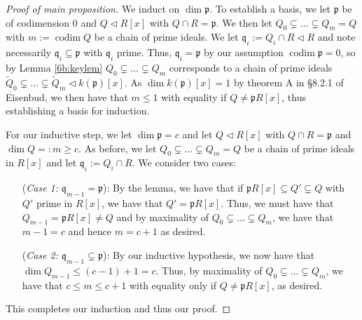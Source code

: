 \documentclass[Letter,12pt]{article}
\newcommand{\pfr}{\mathfrak{p}}
\newcommand{\qfr}{\mathfrak{q}}
\newcommand{\<}{\left\langle}
\renewcommand{\>}{\right\rangle}
\DeclareMathOperator{\codim}{codim}
\theoremstyle{definition}
\begin{document}
\begin{proof}[Proof of main proposition]
We induct on $\dim \pfr$. To establish a basis, we let $\pfr$ be of codimension $0$ and $Q\triangleleft R[x]$ with $Q\cap R=\pfr$. We then let $Q_0\subsetneq \dots \subsetneq Q_m=Q$ with $m:=\codim Q$ be a chain of prime ideals. We let $\qfr_i:=Q_i\cap R\triangleleft R$ and note necessarily $\qfr_i\subseteq \pfr$ with $\qfr_i$ prime. Thus, $\qfr_i=\pfr$ by our assumption $\codim \pfr=0$, so by Lemma \ref{6b:keylem} $Q_0\subsetneq \dots \subsetneq Q_m$ corresponds to a chain of prime ideals $\tilde{Q}_0\subsetneq \dots \subsetneq \tilde{Q}_m\triangleleft k(\pfr)[x]$. As $\dim k(\pfr)[x]=1$ by theorem A in \S8.2.1 of Eisenbud, we then have that $m\leq 1$ with equality if $Q\neq \pfr R[x]$, thus establishing a basis for induction.

For our inductive step, we let $\dim \pfr =c$ and let $Q\triangleleft R[x]$ with $Q\cap R=\pfr$ and $\dim Q=:m\geq c$. As before, we let $Q_0\subsetneq \dots \subsetneq Q_m=Q$ be a chain of prime ideals in $R[x]$ and let $\qfr_i:=Q_i\cap R$. We consider two cases:
\begin{itemize}[itemindent=1in]
	\item[(\emph{Case 1: $\qfr_{m-1}=\pfr$}):] By the lemma, we have that if $\pfr R[x]\subseteq Q'\subsetneq Q$ with $Q'$ prime in $R[x]$, we have that $Q'=\pfr R[x]$. Thus, we must have that $Q_{m-1}=\pfr R[x]\neq Q$ and by maximality of $Q_0\subsetneq \dots \subsetneq Q_m$, we have that $m-1=c$ and hence $m=c+1$ as desired.
	\item[(\emph{Case 2: $\qfr_{m-1}\subsetneq \pfr$}):] By our inductive hypothesis, we now have that $\dim Q_{m-1}\leq (c-1)+1=c$. Thus, by maximality of $Q_0\subsetneq \dots \subsetneq Q_m$, we have that $c\leq m\leq c+1$ with equality only if $Q\neq \pfr R[x]$, as desired.
\end{itemize}
This completes our induction and thus our proof.
\end{proof}
	
\end{document}
